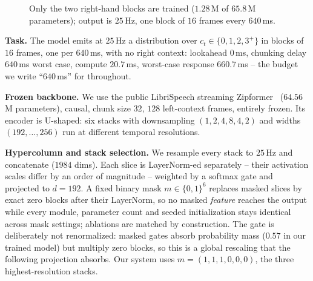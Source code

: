 \documentclass[10pt,conference]{IEEEtran}
\begin{document}
\begin{figure}[t]
\centering
{}
\caption{Only the two right-hand blocks are trained ($1.28$\,M of
$65.8$\,M parameters); output is $25$\,Hz, one block of $16$ frames every
$640$\,ms.}
\label{fig:arch}
\end{figure}

\textbf{Task.} The model emits at $25$\,Hz a distribution over
$c_t\!\in\!\{0,1,2,3^{+}\}$ in blocks of $16$ frames, one per $640$\,ms,
with no right context: lookahead $0$\,ms, chunking delay $640$\,ms worst
case, compute $20.7$\,ms, worst-case response $660.7$\,ms -- the budget we
write ``$640$\,ms'' for throughout.

\textbf{Frozen backbone.} We use the public LibriSpeech streaming
Zipformer~\cite{yao2024zipformer} ($64.56$\,M parameters), causal, chunk
size $32$, $128$ left-context frames, entirely frozen. Its encoder is
U-shaped: six stacks with downsampling $(1,2,4,8,4,2)$ and widths
$(192,\dots,256)$ run at different temporal resolutions.

\textbf{Hypercolumn and stack selection.} We resample every stack to
$25$\,Hz and concatenate ($1984$ dims). Each slice is LayerNorm-ed
separately -- their activation scales differ by an order of magnitude --
weighted by a softmax gate and projected to $d\!=\!192$. A fixed binary mask
$m\!\in\!\{0,1\}^{6}$ replaces masked slices by exact zero blocks after
their LayerNorm, so no masked \emph{feature} reaches the output while every
module, parameter count and seeded initialization stays identical across
mask settings; ablations are matched by construction. The gate is
deliberately not renormalized: masked gates absorb probability mass ($0.57$
in our trained model) but multiply zero blocks, so this is a global
rescaling that the following projection absorbs. Our system uses
$m=(1,1,1,0,0,0)$, the three highest-resolution stacks.
\end{document}
